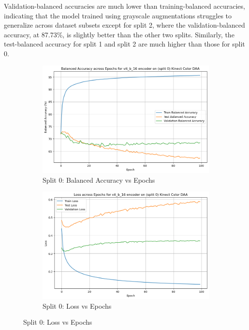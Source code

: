 Validation-balanced accuracies are much lower than training-balanced accuracies, indicating that the model trained using grayscale augmentations struggles to generalize across dataset subsets except for split 2, where the validation-balanced accuracy, at 87.73\%, is slightly better than the other two splits. Similarly, the test-balanced accuracy for split 1 and split 2 are much higher than those for split 0.

\begin{figure}[htbp]
    \centering
    \begin{subfigure}[b]{0.45\textwidth}
        \includegraphics[width=\textwidth]{Images_Thesis/Tensboard_runs_images_all/Experiment_01_Sup_D_A_with_Aug/Split_0/output_bal_acc_split_0_with_aug_d_a.png}
        \caption{Split 0: Balanced Accuracy vs Epochs}
        \label{fig:Exp_2_01}
    \end{subfigure}
    \hfill %
    \begin{subfigure}[b]{0.45\textwidth}
        \includegraphics[width=\textwidth]{Images_Thesis/Tensboard_runs_images_all/Experiment_01_Sup_D_A_with_Aug/Split_0/output_loss_split_0_with_aug_d_a.png}
        \caption{Split 0: Loss vs Epochs}
        \label{fig:Exp_2_02}
    \end{subfigure}


\end{figure}
